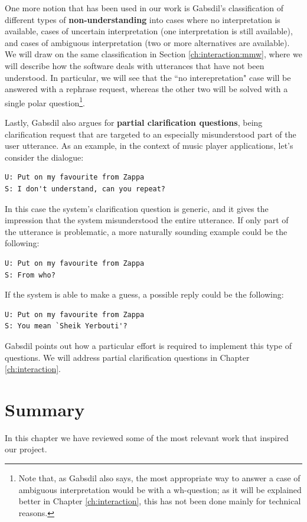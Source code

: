 One more notion that has been used in our work is Gabsdil's classification of different types of \textbf{non-understanding} into cases where no interpretation is available, cases of uncertain interpretation (one interpretation is still available), and cases of ambiguous interpretation (two or more alternatives are available). We will draw on the same classification in Section \ref{ch:interaction:mmw}, where we will describe how the software deals with utterances that have not been understood. In particular, we will see that the ``no interepretation" case will be answered with a rephrase request, whereas the other two will be solved with a single polar question\footnote{Note that, as Gabsdil also says, the most appropriate way to answer a case of ambiguous interpretation would be with a wh-question; as it will be explained better in Chapter \ref{ch:interaction}, this has not been done mainly for technical reasons.}.

Lastly, Gabsdil also argues for \textbf{partial clarification questions}, being clarification request that are targeted to an especially misunderstood part of the user utterance. As an example, in the context of music player applications, let's consider the dialogue:
\begin{verbatim}
U: Put on my favourite from Zappa
S: I don't understand, can you repeat?
\end{verbatim}
In this case the system's clarification question is generic, and it gives the impression that the system misunderstood the entire utterance. If only part of the utterance is problematic, a more naturally sounding example could be the following:
\begin{verbatim}
U: Put on my favourite from Zappa
S: From who?
\end{verbatim}
If the system is able to make a guess, a possible reply could be the following:
\begin{verbatim}
U: Put on my favourite from Zappa
S: You mean `Sheik Yerbouti'?
\end{verbatim}
Gabsdil points out how a particular effort is required to implement this type of questions. We will address partial clarification questions in Chapter \ref{ch:interaction}.

\section{Summary}
In this chapter we have reviewed some of the most relevant work that inspired our project.

